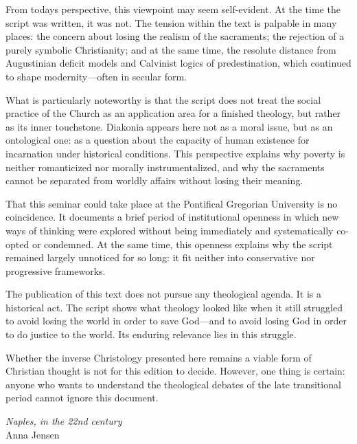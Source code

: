 \documentclass[
]{article}
\begin{document}
From today\textquotesingle s perspective, this viewpoint may seem self-evident. At the time the script was written, it was not. The tension within the text is palpable in many places: the concern about losing the realism of the sacraments; the rejection of a purely symbolic Christianity; and at the same time, the resolute distance from Augustinian deficit models and Calvinist logics of predestination, which continued to shape modernity---often in secular form.

What is particularly noteworthy is that the script does not treat the social practice of the Church as an application area for a finished theology, but rather as its inner touchstone. Diakonia appears here not as a moral issue, but as an ontological one: as a question about the capacity of human existence for incarnation under historical conditions. This perspective explains why poverty is neither romanticized nor morally instrumentalized, and why the sacraments cannot be separated from worldly affairs without losing their meaning.

That this seminar could take place at the Pontifical Gregorian University is no coincidence. It documents a brief period of institutional openness in which new ways of thinking were explored without being immediately and systematically co-opted or condemned. At the same time, this openness explains why the script remained largely unnoticed for so long: it fit neither into conservative nor progressive frameworks.

The publication of this text does not pursue any theological agenda. It is a historical act. The script shows what theology looked like when it still struggled to avoid losing the world in order to save God---and to avoid losing God in order to do justice to the world. Its enduring relevance lies in this struggle.

Whether the inverse Christology presented here remains a viable form of Christian thought is not for this edition to decide. However, one thing is certain: anyone who wants to understand the theological debates of the late transitional period cannot ignore this document.

\emph{Naples, in the 22nd century\\
}Anna Jensen

\section{\texorpdfstring{\hfill\break
}{ }}\label{section-2}
\end{document}
